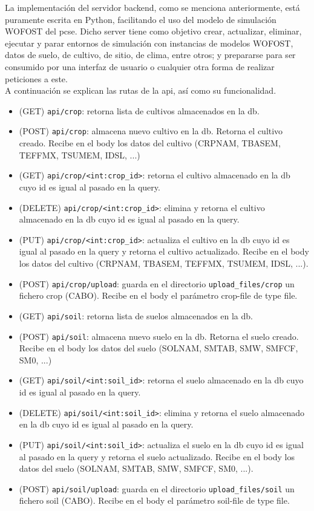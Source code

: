 La implementación del servidor backend, como se menciona anteriormente, está puramente escrita en Python, facilitando el uso del modelo de simulación WOFOST del pcse.
Dicho server tiene como objetivo crear, actualizar, eliminar, ejecutar y parar entornos de simulación con instancias de modelos WOFOST, datos de suelo, de cultivo, de sitio, de clima, entre otros; y prepararse para ser consumido por una interfaz de usuario o cualquier otra forma de realizar peticiones a este.\\

A continuación se explican las rutas de la api, así como su funcionalidad.
\begin{itemize}
	\item (GET) \lstinline|api/crop|: retorna lista de cultivos almacenados en la db.
	\item (POST) \lstinline|api/crop|: almacena nuevo cultivo en la db. Retorna el cultivo creado. Recibe en el body los datos del cultivo (CRPNAM, TBASEM, TEFFMX, TSUMEM, IDSL, ...)
	\item (GET) \lstinline|api/crop/<int:crop_id>|: retorna el cultivo almacenado en la db cuyo id es igual al pasado en la query.
	\item (DELETE) \lstinline|api/crop/<int:crop_id>|: elimina y retorna el cultivo almacenado en la db cuyo id es igual al pasado en la query.
	\item (PUT) \lstinline|api/crop/<int:crop_id>|: actualiza el cultivo en la db cuyo id es igual al pasado en la query y retorna el cultivo actualizado. Recibe en el body los datos del cultivo (CRPNAM, TBASEM, TEFFMX, TSUMEM, IDSL, ...).
	\item (POST) \lstinline|api/crop/upload|: guarda en el directorio \lstinline|upload_files/crop| un fichero crop (CABO). Recibe en el body el parámetro crop-file de type file.
	
	\item (GET) \lstinline|api/soil|: retorna lista de suelos almacenados en la db.
	\item (POST) \lstinline|api/soil|: almacena nuevo suelo en la db. Retorna el suelo creado. Recibe en el body los datos del suelo (SOLNAM, SMTAB, SMW, SMFCF, SM0, ...)
	\item (GET) \lstinline|api/soil/<int:soil_id>|: retorna el suelo almacenado en la db cuyo id es igual al pasado en la query.
	\item (DELETE) \lstinline|api/soil/<int:soil_id>|: elimina y retorna el suelo almacenado en la db cuyo id es igual al pasado en la query.
	\item (PUT) \lstinline|api/soil/<int:soil_id>|: actualiza el suelo en la db cuyo id es igual al pasado en la query y retorna el suelo actualizado. Recibe en el body los datos del suelo (SOLNAM, SMTAB, SMW, SMFCF, SM0, ...).
	\item (POST) \lstinline|api/soil/upload|: guarda en el directorio \lstinline|upload_files/soil| un fichero soil (CABO). Recibe en el body el parámetro soil-file de type file.
	

\end{itemize}
